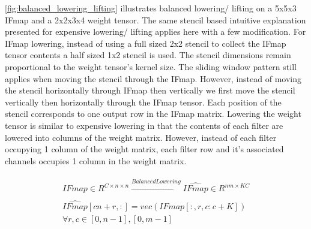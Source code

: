 \autoref{fig:balanced_lowering_lifting} illustrates balanced lowering/
lifting on a 5x5x3 IFmap and a 2x2x3x4 weight tensor. The same stencil based
intuitive explanation presented for expensive lowering/ lifting applies here
with a few modification. For IFmap lowering, instead of using a full sized 2x2
stencil to collect the IFmap tensor contents a half sized 1x2 stencil is used.
The stencil dimensions remain proportional to the weight tensor's kernel size.
The sliding window pattern still applies when moving the stencil through the
IFmap. However, instead of moving the stencil horizontally through IFmap then
vertically we first move the stencil vertically then horizontally through the
IFmap tensor. Each position of the stencil corresponds to one output row in the
IFmap matrix. Lowering the weight tensor is similar to expensive lowering in
that the contents of each filter are lowered into columns of the weight matrix.
However, instead of each filter occupying 1 column of the weight matrix, each
filter row and it's associated channels occupies 1 column in the weight matrix.  
 
\begin{align}
    \begin{gathered}
        IFmap \in R^{C\times n\times n} \xrightarrow[]{Balanced Lowering} \hat{IFmap} \in R^{nm\times KC} \\
        \hat{IFmap}[cn+r, :] = vec(IFmap[:, r, c:c+K]) \\
        \forall r,c \in [0, n-1], [0, m-1]
    \end{gathered}
    \label{math:balanced_lowering_ifmap}
\end{align}

